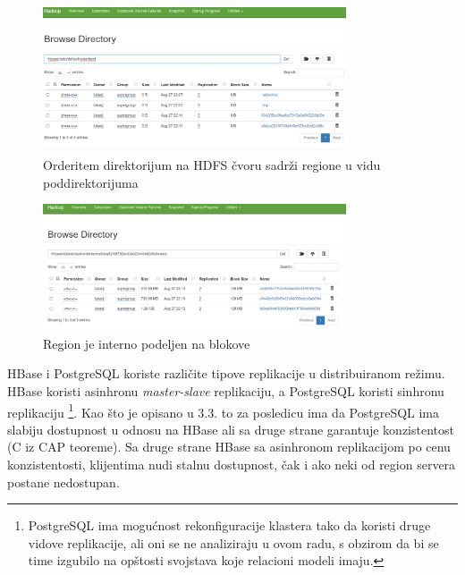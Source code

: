 \documentclass[12pt,oneside]{memoir}
\begin{document}
\begin{figure}[!ht]
  \centering
  \includegraphics[width=0.8\textwidth]{orderitem-datanode.png}
  \caption{Orderitem direktorijum na HDFS čvoru sadrži regione u vidu poddirektorijuma}
  \label{fig:grafikon}
\end{figure}

\begin{figure}[!ht]
  \centering
  \includegraphics[width=0.8\textwidth]{orderitem-datanode-regions-blocks.png}
  \caption{Region je interno podeljen na blokove}
  \label{fig:grafikon}
\end{figure}

\pagebreak

HBase i PostgreSQL koriste različite tipove replikacije u distribuiranom režimu. HBase koristi asinhronu \textit{master-slave} replikaciju, a PostgreSQL koristi sinhronu replikaciju \footnote{PostgreSQL ima mogućnost rekonfiguracije klastera tako da koristi druge vidove replikacije, ali oni se ne analiziraju u ovom radu, s obzirom da bi se time izgubilo na opštosti svojstava koje relacioni modeli imaju.}. Kao što je opisano u 3.3. to za posledicu ima da PostgreSQL ima slabiju dostupnost u odnosu na HBase ali sa druge strane garantuje konzistentost (C iz CAP teoreme).
Sa druge strane HBase sa asinhronom replikacijom po cenu konzistentosti, klijentima nudi stalnu dostupnost, čak i ako neki od region servera postane nedostupan. 
\end{document}
